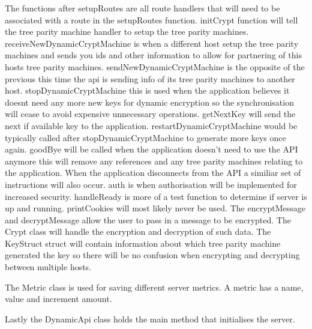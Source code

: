 The functions after setupRoutes are all route handlers that will need to be associated with a route in the setupRoutes function. initCrypt function will tell the tree parity machine handler to setup the tree parity machines. receiveNewDynamicCryptMachine is when a different host setup the tree parity machines and sends you ids and other information to allow for partnering of this hosts tree parity machines. sendNewDynamicCryptMachine is the opposite of the previous this time the api is sending info of its tree parity machines to another host. stopDynamicCryptMachine this is used when the application believes it doesnt need any more new keys for dynamic encryption so the synchronisation will cease to avoid expensive unnecessary operations. getNextKey will send the next if available key to the application. restartDynamicCryptMachine would be typically called after stopDynamicCryptMachine to generate more keys once again. goodBye will be called when the application doesn't need to use the API anymore this will remove any references and any tree parity machines relating to the application. When the application disconnects from the API a similiar set of instructions will also occur. auth is when authorisation will be implemented for increased security. handleReady is more of a test function to determine if server is up and running. printCookies will most likely never be used. The encryptMessage and decryptMessage allow the user to pass in a message to be encrypted. The Crypt class will handle the encryption and decryption of such data. The KeyStruct struct will contain information about which tree parity machine generated the key so there will be no confusion when encrypting and decrypting between multiple hosts.

The Metric class is used for saving different server metrics. A metric has a name, value and increment amount.

Lastly the DynamicApi class holds the main method that initialises the server.






